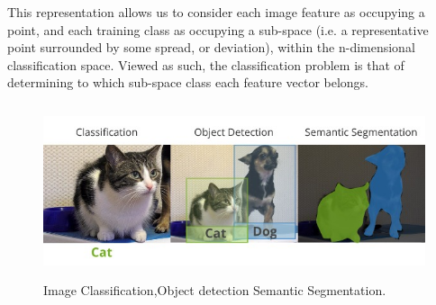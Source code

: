  This representation allows us to consider each image feature as occupying a point, and each training class as occupying a sub-space (i.e. a representative point surrounded by some spread, or deviation), within the n-dimensional classification space. Viewed as such, the classification problem is that of determining to which sub-space class each feature vector belongs.
\begin{figure}[H]
  \centering
  \includegraphics[height=2in]{images/classification_detection_segmentaion_comparisons.jpeg}
   \caption{Image Classification,Object detection Semantic Segmentation.}
\end{figure}
